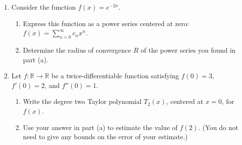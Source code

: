 \documentclass[11pt]{article}
\begin{document}
\begin{enumerate}
\item Consider the function $\displaystyle f(x) = e^{-2x}$.
\begin{enumerate}
\item Express this function as a power series centered at zero: $f(x) = \sum_{n = 0}^{\infty} c_n x^n$.
\item Determine the radius of convergence $R$ of the power series you found in part (a).
\end{enumerate}

\item Let $f\colon \mathbb{R}\to \mathbb{R}$ be a twice-differentiable function satisfying $f(0) = 3$, $f'(0) = 2$, and $f''(0)=1$.
\begin{enumerate}
\item Write the degree two Taylor polynomial $T_2(x)$, centered at $x=0$, for $f(x)$.
\item Use your answer in part (a) to estimate the value of $f(2)$. (You do not need to give any bounds on the error of your estimate.) 
\end{enumerate}

\end{enumerate}
\end{document}
